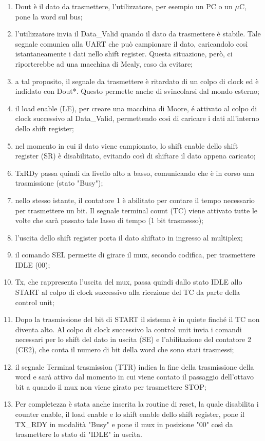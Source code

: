 \documentclass[a4paper, titlepage]{article}
\begin{document}
\begin{enumerate}
    \item Dout è il dato da trasmettere, l'utilizzatore, per esempio un PC o un $\mu$C, pone la word sul bus;
    \item l'utilizzatore invia il Data\_Valid quando il dato da trasmettere è stabile. Tale segnale comunica alla UART che può campionare il dato, caricandolo così istantaneamente i dati nello shift register. Questa situazione, però, ci riporterebbe ad una macchina di Mealy, caso da evitare;
    \item a tal proposito, il segnale da trasmettere è ritardato di un colpo di clock ed è indidato con  Dout*. Questo permette anche di svincolarsi dal mondo esterno;
    \item il load enable (LE), per creare una macchina di Moore, é attivato al colpo di clock successivo al Data\_Valid, permettendo così di caricare i dati all'interno dello shift register;
    \item nel momento in cui il dato viene campionato, lo shift enable dello shift register (SR) è disabilitato, evitando così di shiftare il dato appena caricato;
    \item TxRDy passa quindi da livello alto a basso, comunicando che è in corso una trasmissione (stato "Busy");
    \item nello stesso istante, il contatore 1 è abilitato per contare il tempo necessario per trasmettere un bit. Il segnale terminal count (TC) viene attivato tutte le volte che sarà passato tale lasso di tempo (1 bit trasmesso);
    \item l'uscita dello shift register porta il dato shiftato in ingresso al multiplex;
    \item il comando SEL permette di girare il mux, secondo codifica, per trasmettere IDLE (00);
    \item Tx, che rappresenta l'uscita del mux, passa quindi dallo stato IDLE allo START al colpo di clock successivo alla ricezione del TC da parte della control unit;
    \item Dopo la trasmissione del bit di START il sistema è in quiete finché il TC non diventa alto. Al colpo di clock successivo la control unit invia i comandi necessari per lo shift del dato in uscita (SE) e l'abilitazione del contatore 2 (CE2), che conta il numero di bit della word che sono stati trasmessi;
    \item il segnale Terminal trasmission (TTR) indica la fine della trasmissione della word e sarà attivo dal momento in cui viene contato il passaggio dell'ottavo bit a quando il mux non viene girato per trasmettere STOP;
    \item Per completezza è stata anche inserita la routine di reset, la quale disabilita i counter enable, il load enable e lo shift enable dello shift register, pone il TX\_RDY in modalità "Busy" e pone il mux in posizione "00" così da trasmettere lo stato di "IDLE" in uscita.
\end{enumerate}
\end{document}
